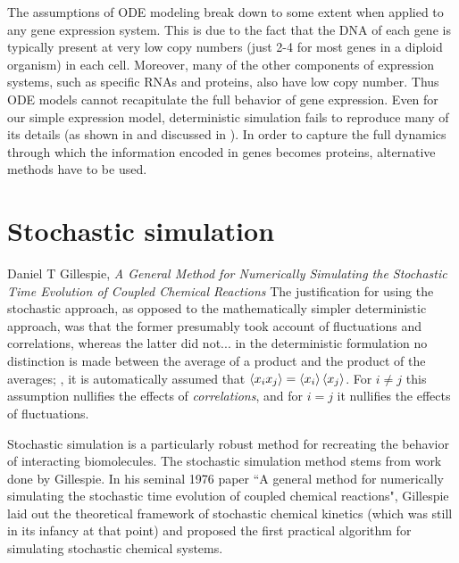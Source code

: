 The assumptions of ODE modeling break down to some extent when applied to any gene expression system\supercite{Roberts:2015iu}. This is due to the fact that the DNA of each gene is typically present at very low copy numbers (just 2-4 for most genes in a diploid organism) in each cell. Moreover, many of the other components of expression systems, such as specific RNAs and proteins, also have low copy number. Thus ODE models cannot recapitulate the full behavior of gene expression. Even for our simple expression model, deterministic simulation fails to reproduce many of its details (as shown in  and discussed in ). In order to capture the full dynamics through which the information encoded in genes becomes proteins, alternative methods have to be used.



\section{Stochastic simulation}\label{sec:stochastic_simulation}

\begin{chapquote}{Daniel T Gillespie, \textit{A General Method for Numerically Simulating the Stochastic Time Evolution
of Coupled Chemical Reactions}\supercite{Gillespie:1976bj}}
The justification for using the stochastic approach, as opposed to the mathematically simpler deterministic approach, was that the former presumably took account of fluctuations and correlations, whereas the latter did not... in the deterministic formulation no distinction is made between the average of a product and the product of the averages; \ie, it is automatically assumed that $ \left\langle x_{i} x_{j} \right\rangle = \left\langle x_i \right\rangle \left\langle x_j \right\rangle$. For $i \neq j$ this assumption nullifies the effects of \textit{correlations}, and for $i = j$ it nullifies the effects of \textrm{fluctuations}. 
\end{chapquote}

Stochastic simulation is a particularly robust method for recreating the behavior of interacting biomolecules. The stochastic simulation method stems from work done by Gillespie. In his seminal 1976 paper ``A general method for numerically simulating the stochastic time evolution of coupled chemical reactions"\supercite{Gillespie:1976bj}, Gillespie laid out the theoretical framework of stochastic chemical kinetics (which was still in its infancy\supercite{McQuarrie:2016cc,Oppenheim:1969hr,Kurtz:2003gz} at that point) and proposed the first practical algorithm for simulating stochastic chemical systems.

